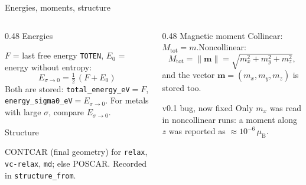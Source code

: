 \documentclass[aspectratio=169,10pt,t]{beamer}
\newcommand{\code}[1]{\texttt{#1}}
\begin{document}
\begin{frame}{Energies, moments, structure}
\begin{columns}[T]
\begin{column}{0.48\textwidth}
{\fsemi\color{accent} Energies}
\small

\(F\) = last free energy \code{TOTEN}, \(E_0\) = energy without entropy:
\[
 E_{\sigma\to0}=\tfrac12\,(F+E_0)
\]
Both are stored: \code{total\_energy\_eV}\(=F\), \code{energy\_sigma0\_eV}\(=E_{\sigma\to0}\).
For metals with large \(\sigma\), compare \(E_{\sigma\to0}\).

\vspace{2mm}
{\fsemi\color{accent} Structure}

CONTCAR (final geometry) for \texttt{relax}, \texttt{vc-relax}, \texttt{md}; else POSCAR. Recorded in \code{structure\_from}.
\end{column}
\begin{column}{0.48\textwidth}
{\fsemi\color{accent} Magnetic moment}
\small
Collinear: \(M_{\mathrm{tot}}=m\).\quad Noncollinear:
\[
M_{\mathrm{tot}}=\lVert\mathbf m\rVert=\sqrt{m_x^2+m_y^2+m_z^2},
\]
and the vector \(\mathbf m=(m_x,m_y,m_z)\) is stored too.
\vspace{2mm}
\begin{warnbox}{v0.1 bug, now fixed}
\footnotesize
Only \(m_x\) was read in noncollinear runs: a moment along \(z\) was reported as \(\approx 10^{-6}\,\mu_{\mathrm B}\).
\end{warnbox}
\end{column}
\end{columns}
\end{frame}
\end{document}
